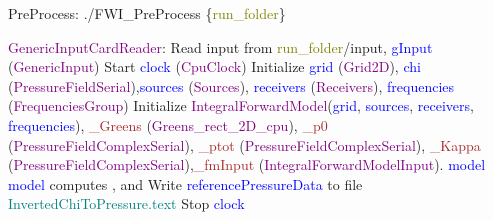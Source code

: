 \documentclass{article}
\begin{document}
\begin{algorithm}
\caption{PreProcess: ./FWI\_PreProcess \{\textcolor{olive}{run\_folder}\}}
\begin{algorithmic}
\State \textcolor{purple}{GenericInputCardReader}: Read input from \textcolor{olive}{run\_folder}/input, \textcolor{blue}{gInput} (\textcolor{purple}{GenericInput})
\State Start \textcolor{blue}{clock} (\textcolor{purple}{CpuClock})
\State Initialize \textcolor{blue}{grid} (\textcolor{purple}{Grid2D}), \textcolor{blue}{chi} (\textcolor{purple}{PressureFieldSerial}),\State \textcolor{blue}{sources} (\textcolor{purple}{Sources}), \textcolor{blue}{receivers} (\textcolor{purple}{Receivers}), \textcolor{blue}{frequencies} (\textcolor{purple}{FrequenciesGroup})
\State {}
\State Initialize \textcolor{purple}{IntegralForwardModel}(\textcolor{blue}{grid}, \textcolor{blue}{sources}, \textcolor{blue}{receivers}, \textcolor{blue}{frequencies}), \State \textcolor{brown}{\_Greens} (\textcolor{purple}{Greens\_rect\_2D\_cpu}), \textcolor{brown}{\_p0} (\textcolor{purple}{PressureFieldComplexSerial}), \State \textcolor{brown}{\_ptot} (\textcolor{purple}{PressureFieldComplexSerial}), \textcolor{brown}{\_Kappa} (\textcolor{purple}{PressureFieldComplexSerial}),\State \textcolor{brown}{\_fmInput} (\textcolor{purple}{IntegralForwardModelInput}).
\State \Return \textcolor{blue}{model}
\EndProcedure
\State \textcolor{blue}{model} computes ,  and 
\State Write \textcolor{blue}{referencePressureData} to file \textcolor{teal}{InvertedChiToPressure.text}
\EndProcedure
\State Stop \textcolor{blue}{clock}
\end{algorithmic}
\end{algorithm}
\end{document}
